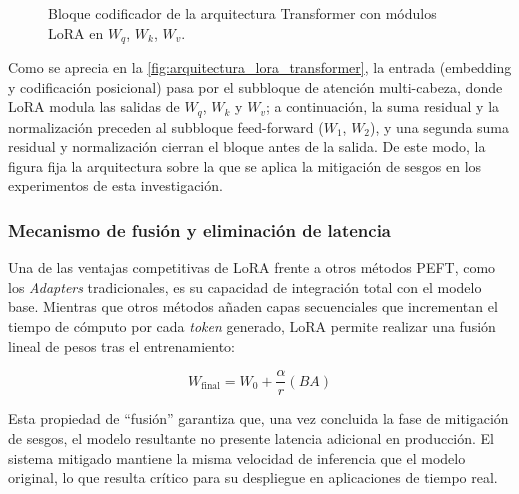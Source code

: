 \documentclass[12pt,a4paper]{report}
\begin{document}
\begin{figure}[H]
    \caption{Bloque codificador de la arquitectura Transformer con módulos LoRA en $W_q$, $W_k$, $W_v$.}
    \label{fig:arquitectura_lora_transformer}
\end{figure}

Como se aprecia en la \autoref{fig:arquitectura_lora_transformer}, la entrada (embedding y codificación posicional) pasa por el subbloque de atención multi-cabeza, donde LoRA modula las salidas de $W_q$, $W_k$ y $W_v$; a continuación, la suma residual y la normalización preceden al subbloque feed-forward ($W_1$, $W_2$), y una segunda suma residual y normalización cierran el bloque antes de la salida. De este modo, la figura fija la arquitectura sobre la que se aplica la mitigación de sesgos en los experimentos de esta investigación.

\subsubsection{Mecanismo de fusión y eliminación de latencia}
\label{par:lora_merge}

Una de las ventajas competitivas de LoRA frente a otros métodos PEFT, como los \textit{Adapters} tradicionales, es su capacidad de integración total con el modelo base. Mientras que otros métodos añaden capas secuenciales que incrementan el tiempo de cómputo por cada \textit{token} generado, LoRA permite realizar una fusión lineal de pesos tras el entrenamiento:

\begin{equation}
W_{\text{final}} = W_0 + \frac{\alpha}{r}(BA)
\end{equation}


Esta propiedad de ``fusión'' garantiza que, una vez concluida la fase de mitigación de sesgos, el modelo resultante no presente latencia adicional en producción. El sistema mitigado mantiene la misma velocidad de inferencia que el modelo original, lo que resulta crítico para su despliegue en aplicaciones de tiempo real.
\end{document}
